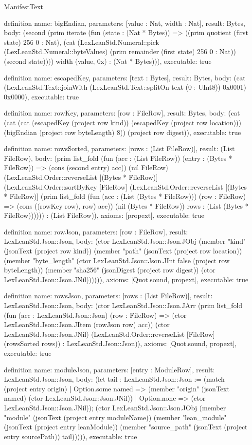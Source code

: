 \begin{lexlean}{ManifestText}
\begin{semanticmodule}
definition{
  name: bigEndian,
  parameters: [value : Nat, width : Nat],
  result: Bytes,
  body: (second (prim iterate (fun (state : (Nat * Bytes)) => ((prim quotient (first state) 256 0 : Nat), (cat (LexLeanStd.Numeral::pick (LexLeanStd.Numeral::byteValues) (prim remainder (first state) 256 0 : Nat)) (second state)))) width (value, 0x) : (Nat * Bytes))),
  executable: true
}

definition{
  name: escapedKey,
  parameters: [text : Bytes],
  result: Bytes,
  body: (cat (LexLeanStd.Text::joinWith (LexLeanStd.Text::splitOn text (0 : UInt8)) 0x0001) 0x0000),
  executable: true
}

definition{
  name: rowKey,
  parameters: [row : FileRow],
  result: Bytes,
  body: (cat (cat (cat (escapedKey (project row kind)) (escapedKey (project row location))) (bigEndian (project row byteLength) 8)) (project row digest)),
  executable: true
}

definition{
  name: rowsSorted,
  parameters: [rows : (List FileRow)],
  result: (List FileRow),
  body: (prim list_fold (fun (acc : (List FileRow)) (entry : (Bytes * FileRow)) => (cons (second entry) acc)) (nil FileRow) (LexLeanStd.Order::reverseList [(Bytes * FileRow)] (LexLeanStd.Order::sortByKey [FileRow] (LexLeanStd.Order::reverseList [(Bytes * FileRow)] (prim list_fold (fun (acc : (List (Bytes * FileRow))) (row : FileRow) => (cons ((rowKey row), row) acc)) (nil (Bytes * FileRow)) rows : (List (Bytes * FileRow)))))) : (List FileRow)),
  axioms: [propext],
  executable: true
}

definition{
  name: rowJson,
  parameters: [row : FileRow],
  result: LexLeanStd.Json::Json,
  body: (ctor LexLeanStd.Json::Json.JObj (member "kind" (jsonText (project row kind)) (member "path" (jsonText (project row location)) (member "byte_length" (ctor LexLeanStd.Json::Json.JInt false (project row byteLength)) (member "sha256" (jsonDigest (project row digest)) (ctor LexLeanStd.Json::Json.JNil)))))),
  axioms: [Quot.sound, propext],
  executable: true
}

definition{
  name: rowsJson,
  parameters: [rows : (List FileRow)],
  result: LexLeanStd.Json::Json,
  body: (ctor LexLeanStd.Json::Json.JArr (prim list_fold (fun (acc : LexLeanStd.Json::Json) (row : FileRow) => (ctor LexLeanStd.Json::Json.JItem (rowJson row) acc)) (ctor LexLeanStd.Json::Json.JNil) (LexLeanStd.Order::reverseList [FileRow] (rowsSorted rows)) : LexLeanStd.Json::Json)),
  axioms: [Quot.sound, propext],
  executable: true
}

definition{
  name: moduleJson,
  parameters: [entry : ModuleRow],
  result: LexLeanStd.Json::Json,
  body: (let tail : LexLeanStd.Json::Json := (match (project entry origin)
    | Option.some named => (member "origin" (jsonText named) (ctor LexLeanStd.Json::Json.JNil))
    | Option.none => (ctor LexLeanStd.Json::Json.JNil)); (ctor LexLeanStd.Json::Json.JObj (member "module" (jsonText (project entry moduleName)) (member "lean_module" (jsonText (project entry leanModule)) (member "source_path" (jsonText (project entry sourcePath)) tail))))),
  executable: true
}


\end{semanticmodule}
\end{lexlean}
